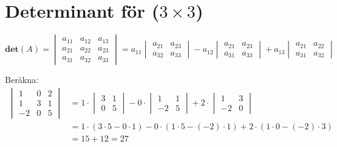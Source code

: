 \section{Determinant för ($3 \times 3$)} %
\label{sec:determinant_f_r_}
\begin{Def}
    \[
        \mathbf{det}(A) = \begin{vmatrix} a_{11}&a_{12}&a_{13}\\a_{21}&a_{22}&a_{23}\\a_{31}&a_{32}&a_{33} \end{vmatrix} = a_{11} \begin{vmatrix} a_{21}&a_{23}\\a_{32}&a_{33} \end{vmatrix} - a_{12} \begin{vmatrix} a_{21}&a_{23}\\a_{31}&a_{33} \end{vmatrix} + a_{13} \begin{vmatrix} a_{21}&a_{22}\\a_{31}&a_{32} \end{vmatrix}
    \]
\end{Def}
\begin{Ex}
    Beräkna:
    \begin{align*}
    \begin{vmatrix} 1&0&2\\1&3&1\\-2&0&5 \end{vmatrix} &= 1 \cdot \begin{vmatrix} 3&1\\0&5 \end{vmatrix} - 0 \cdot \begin{vmatrix} 1&1\\-2&5 \end{vmatrix} + 2 \cdot \begin{vmatrix} 1&3\\-2&0 \end{vmatrix} \\
    &= 1 \cdot (3 \cdot 5 - 0 \cdot 1) - 0 \cdot (1 \cdot 5 - (-2) \cdot 1) + 2 \cdot (1 \cdot 0 - (-2) \cdot 3) \\
    &= 15 + 12 = 27
    \end{align*}
\end{Ex}
